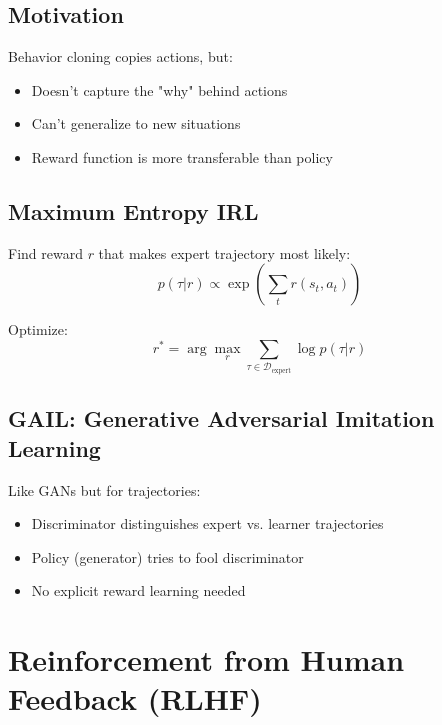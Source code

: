 
\subsection{Motivation}

Behavior cloning copies actions, but:
\begin{itemize}
    \item Doesn't capture the "why" behind actions
    \item Can't generalize to new situations
    \item Reward function is more transferable than policy
\end{itemize}

\subsection{Maximum Entropy IRL}

Find reward $r$ that makes expert trajectory most likely:
\begin{equation}
    p(\tau | r) \propto \exp\left(\sum_t r(s_t, a_t)\right)
\end{equation}

Optimize:
\begin{equation}
    r^* = \arg\max_r \sum_{\tau \in \mathcal{D}_{\text{expert}}} \log p(\tau | r)
\end{equation}

\subsection{GAIL: Generative Adversarial Imitation Learning}


Like GANs but for trajectories:
\begin{itemize}
    \item Discriminator distinguishes expert vs. learner trajectories
    \item Policy (generator) tries to fool discriminator
    \item No explicit reward learning needed
\end{itemize}


\section{Reinforcement from Human Feedback (RLHF)}


